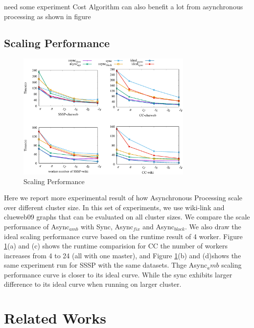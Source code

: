{\color{blue} need some experiment
 Cost Algorithm can also benefit a lot from asynchronous processing as shown in figure 
}
 \subsection{Scaling Performance}
 \begin{figure}[!t]
	\vspace{0.1in}
	\centering
	\includegraphics[width=3.4in]{figuration/scale.eps}
	\vspace{-0.1in}
	\caption{Scaling Performance}
	\label{fig:scale}
	\vspace{-0.2in}
\end{figure}

 Here we report more experimental result of how Asynchronous Processing scale over different cluster size. 
 In this set of experiments, we use wiki-link and clueweb09 graphs that can be evaluated on all cluster sizes.
 We compare the scale performance of Async$_{amb}$ with Sync, Async$_{fix}$ and Async$_{block}$. We also draw the ideal scaling performance curve based on the runtime result of 4 worker.  Figure \ref{fig:scale}(a) and (c) shows the runtime comparision for CC the number of workers increases from 4 to 24 (all with one master), and Figure \ref{fig:scale}(b) and (d)shows the same experiment run for SSSP with the same datasets.
Thge Async$_amb$ scaling performance curve is closer to its ideal curve. While the sync exhibits larger difference to its ideal curve  when running on larger cluster.  

\section{Related Works}
\label{sec:related}

